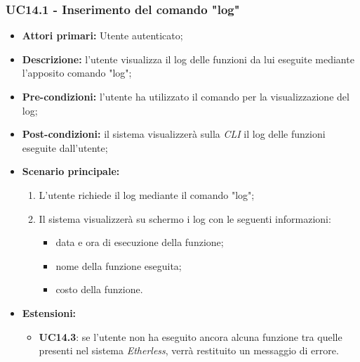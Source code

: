 \subsubsection{UC14.1 - Inserimento del comando "log"}
\begin{itemize}
	\item \textbf{Attori primari:} Utente autenticato;
	\item \textbf{Descrizione:} l'utente visualizza il log delle funzioni da lui eseguite mediante l'apposito comando "log"; 
	\item \textbf{Pre-condizioni:} l'utente ha utilizzato il comando per la visualizzazione del log;
	\item \textbf{Post-condizioni:} il sistema visualizzerà sulla \textit{CLI\glo} il log delle funzioni eseguite dall'utente;
	\item \textbf{Scenario principale:} 
	\begin{enumerate}
		\item L'utente richiede il log mediante il comando "log";
		\item Il sistema visualizzerà su schermo i log con le seguenti informazioni:
		\begin{itemize}
			\item data e ora di esecuzione della funzione;
			\item nome della funzione eseguita;
			\item costo della funzione.
		\end{itemize}
	\end{enumerate}
	\item \textbf{Estensioni:}
	\begin{itemize}
		\item \textbf{UC14.3}: se l'utente non ha eseguito ancora alcuna funzione tra quelle presenti nel sistema \textit{Etherless\glos}, verrà restituito un messaggio di errore.
	\end{itemize}
\end{itemize}